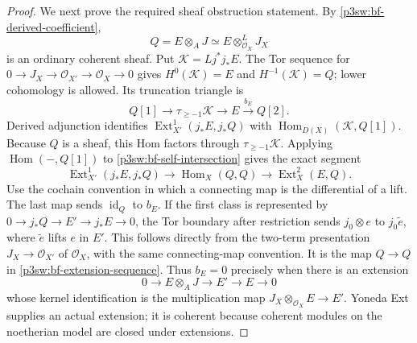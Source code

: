 \documentclass[11pt]{article}
\numberwithin{equation}{section}
\begin{document}
\begin{proof}
We next prove the required sheaf obstruction statement.  By
\eqref{p3sw:bf-derived-coefficient},
\[
 Q=E\otimes_AJ
    \simeq E\otimes_{\mathcal O_X}^LJ_X
\]
is an ordinary coherent sheaf.  Put
\(\mathcal K=Lj^*j_*E\).  The Tor sequence for
\(0\to J_X\to\mathcal O_{X'}\to\mathcal O_X\to0\) gives
\(H^0(\mathcal K)=E\) and \(H^{-1}(\mathcal K)=Q\);
lower cohomology is allowed.  Its truncation triangle is
\begin{equation}
\label{p3sw:bf-self-intersection}
 Q[1]\longrightarrow\tau_{\geq-1}\mathcal K
       \longrightarrow E\xrightarrow{b_E}Q[2].
\end{equation}
Derived adjunction identifies
\(\operatorname{Ext}^1_{X'}(j_*E,j_*Q)\) with
\(\operatorname{Hom}_{D(X)}(\mathcal K,Q[1])\).
Because \(Q\) is a sheaf, this Hom factors through
\(\tau_{\geq-1}\mathcal K\).  Applying
\(\operatorname{Hom}(-,Q[1])\) to
\eqref{p3sw:bf-self-intersection} gives the exact segment
\begin{equation}
\label{p3sw:bf-extension-sequence}
 \operatorname{Ext}^1_{X'}(j_*E,j_*Q)
 \longrightarrow\operatorname{Hom}_X(Q,Q)
 \longrightarrow\operatorname{Ext}^2_X(E,Q).
\end{equation}
Use the cochain convention in which a connecting map is the
differential of a lift.  The last map sends \(\operatorname{id}_Q\)
to \(b_E\).  If the first class is represented by
\(0\to j_*Q\to E'\to j_*E\to0\), the Tor boundary after
restriction sends \(j_0\otimes e\) to \(j_0\widetilde e\),
where \(\widetilde e\) lifts \(e\) in \(E'\).  This follows
directly from the two-term presentation
\(J_X\to\mathcal O_{X'}\) of \(\mathcal O_X\), with the same
connecting-map convention.  It is the map \(Q\to Q\) in
\eqref{p3sw:bf-extension-sequence}.  Thus \(b_E=0\) precisely
when there is an extension
\begin{equation}
\label{p3sw:bf-multiplication-extension}
 0\longrightarrow E\otimes_AJ\longrightarrow E'
       \longrightarrow E\longrightarrow0
\end{equation}
whose kernel identification is the multiplication map
\(J_X\otimes_{\mathcal O_X}E\to E'\).
Yoneda Ext supplies an actual extension; it is coherent because
coherent modules on the noetherian model are closed under
extensions.


\end{proof}
\end{document}

